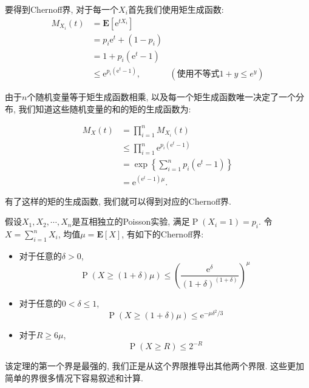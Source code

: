 要得到Chernoff界, 对于每一个$X_i$首先我们使用矩生成函数: 
$$
\begin{aligned}
M_{X_i}(t) & =\mathbf{E}\left[\mathrm{e}^{t X_i}\right] \\
& =p_i \mathrm{e}^t+\left(1-p_i\right) \\
& =1+p_i\left(\mathrm{e}^t-1\right) \\
& \leq \mathrm{e}^{p_i\left(\mathrm{e}^t-1\right)}, & (\text{使用不等式} 1+y\leq e^y)
\end{aligned}
$$

由于$n$个随机变量等于矩生成函数相乘, 以及每一个矩生成函数唯一决定了一个分布, 我们知道这些随机变量的和的矩的生成函数为: 

$$
\begin{aligned}
M_X(t) & =\prod_{i=1}^n M_{X_i}(t) \\
& \leq \prod_{i=1}^n \mathrm{e}^{p_i\left(\mathrm{e}^t-1\right)} \\
& =\exp \left\{\sum_{i=1}^n p_i\left(\mathrm{e}^t-1\right)\right\} \\
& =\mathrm{e}^{\left(\mathrm{e}^t-1\right) \mu} .
\end{aligned}
$$

有了这样的矩的生成函数, 我们就可以得到对应的Chernoff界. 
\begin{theorem}
    假设$X_1, X_2, \cdots, X_n$是互相独立的Poisson实验, 满足$\operatorname{P}\left(X_i=1\right)=p_i$. 令$X=\sum_{i=1}^n X_i$, 均值$\mu=\mathbf{E}[X]$, 有如下的Chernoff界: 
    \begin{itemize}
        \item 对于任意的$\delta>0$, $$\operatorname{P}(X \geq(1+\delta) \mu) \leq\left(\frac{\mathrm{e}^\delta}{(1+\delta)^{(1+\delta)}}\right)^\mu$$
        \item 对于任意的$0<\delta\leq 1$, $$
        \operatorname{P}(X \geq(1+\delta) \mu) \leq \mathrm{e}^{-\mu \delta^2 / 3}$$
        \item 对于$R\geq 6\mu$, $$
        \operatorname{P}(X \geq R) \leq 2^{-R}$$
    \end{itemize}
\end{theorem}

该定理的第一个界是最强的, 我们正是从这个界限推导出其他两个界限. 这些更加简单的界很多情况下容易叙述和计算. 

